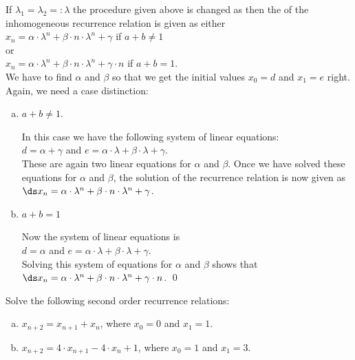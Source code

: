 If $\lambda_1 = \lambda_2 =: \lambda$  the procedure given above is changed as then the  of
the inhomogeneous recurrence relation is given as either
\\[0.2cm]
\hspace*{1.3cm}
$x_n = \alpha \cdot \lambda^n + \beta \cdot n \cdot \lambda^n + \gamma$ \quad if $a + b \not= 1$
\\[0.2cm]
or
\\[0.2cm]
\hspace*{1.3cm}
$x_n = \alpha \cdot \lambda^n + \beta \cdot n \cdot \lambda^n + \gamma \cdot n$ \quad if $a + b = 1$.
\\[0.2cm]
We have to find $\alpha$ and $\beta$ so that we get the initial values $x_0 = d$ and $x_1 = e$ right.
Again, we need a case distinction:
\begin{enumerate}[(a)]
\item $a + b \not = 1$.
  
      In this case we have the following system of linear equations:
      \\[0.2cm]
      \hspace*{1.3cm}
      $d = \alpha + \gamma$ \quad and \quad $e = \alpha \cdot \lambda + \beta \cdot \lambda + \gamma$.
      \\[0.2cm]
      These are again two linear equations for $\alpha$ and $\beta$.  
      Once we have solved these equations for $\alpha$ and
      $\beta$, the solution of the recurrence relation is now given as
      \\[0.2cm]
      \hspace*{1.3cm}
      $\ds x_{n} = \alpha \cdot \lambda^n + \beta \cdot n \cdot \lambda^n + \gamma$.
\item $a + b = 1$
      
      Now the system of linear equations is 
      \\[0.2cm]
      \hspace*{1.3cm}
      $d = \alpha$ \quad and \quad $e = \alpha \cdot \lambda + \beta \cdot \lambda + \gamma$. 
      \\[0.2cm]
      Solving this system of equations for $\alpha$ and $\beta$ shows that
      \\[0.2cm]
      \hspace*{1.3cm}
      $\ds x_{n} = \alpha \cdot \lambda^n + \beta \cdot n \cdot \lambda^n + \gamma \cdot n$. \qed
\end{enumerate}

\exercise
 Solve the following second order recurrence relations:
\begin{enumerate}[(a)]
\item $x_{n+2} = x_{n+1} + x_n$, \quad where $x_0 = 0$ and $x_1 = 1$.  
\item $x_{n+2} = 4 \cdot x_{n+1} - 4 \cdot x_n + 1$, \quad where $x_0 = 1$ and $x_1 = 3$.  \eox
\end{enumerate}


